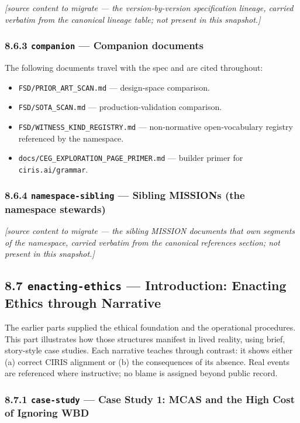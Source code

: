 \documentclass[11pt]{article}
\begin{document}
\textit{[source content to migrate — the version-by-version specification lineage, carried verbatim from the canonical lineage table; not present in this snapshot.]}


\subsubsection*{8.6.3 \texttt{companion} — Companion documents}


The following documents travel with the spec and are cited throughout:


\begin{itemize}\setlength\itemsep{0pt}
\item \texttt{FSD/PRIOR\_ART\_SCAN.md} — design-space comparison.
\item \texttt{FSD/SOTA\_SCAN.md} — production-validation comparison.
\item \texttt{FSD/WITNESS\_KIND\_REGISTRY.md} — non-normative open-vocabulary registry referenced by the namespace.
\item \texttt{docs/CEG\_EXPLORATION\_PAGE\_PRIMER.md} — builder primer for \texttt{ciris.ai/grammar}.
\end{itemize}


\subsubsection*{8.6.4 \texttt{namespace-sibling} — Sibling MISSIONs (the namespace stewards)}


\textit{[source content to migrate — the sibling MISSION documents that own segments of the namespace, carried verbatim from the canonical references section; not present in this snapshot.]}


\subsection*{8.7 \texttt{enacting-ethics} — Introduction: Enacting Ethics through Narrative}


The earlier parts supplied the ethical foundation and the operational procedures. This part illustrates how those structures manifest in lived reality, using brief, story-style case studies. Each narrative teaches through contrast: it shows either (a) correct CIRIS alignment or (b) the consequences of its absence. Real events are referenced where instructive; no blame is assigned beyond public record.


\subsubsection*{8.7.1 \texttt{case-study} — Case Study 1: MCAS and the High Cost of Ignoring WBD}
\end{document}
